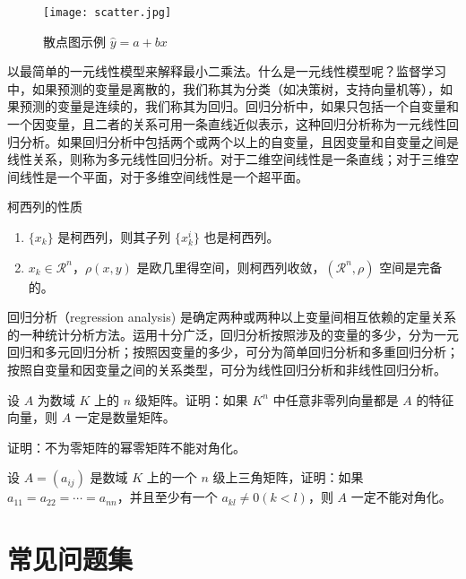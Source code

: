 \documentclass[lang=cn,10pt]{elegantbook}
\begin{document}
\begin{figure}[htbp]
  \centering
  \texttt{[image: scatter.jpg]}
  \caption{散点图示例 $\hat{y}=a+bx$ \label{fig:scatter}}
\end{figure}

以最简单的一元线性模型来解释最小二乘法。什么是一元线性模型呢？监督学习中，如果预测的变量是离散的，我们称其为分类（如决策树，支持向量机等），如果预测的变量是连续的，我们称其为回归。回归分析中，如果只包括一个自变量和一个因变量，且二者的关系可用一条直线近似表示，这种回归分析称为一元线性回归分析。如果回归分析中包括两个或两个以上的自变量，且因变量和自变量之间是线性关系，则称为多元线性回归分析。对于二维空间线性是一条直线；对于三维空间线性是一个平面，对于多维空间线性是一个超平面。

\begin{property}\label{property:cauchy}
柯西列的性质
\begin{enumerate}
\item $\{x_k\}$ 是柯西列，则其子列 $\{x_k^i\}$ 也是柯西列。
\item $x_k\in \mathcal{R}^n$，$\rho(x,y)$ 是欧几里得空间，则柯西列收敛，$(\mathcal{R}^n,\rho)$ 空间是完备的。
\end{enumerate}
\end{property}

\begin{conclusion}
回归分析（regression analysis) 是确定两种或两种以上变量间相互依赖的定量关系的一种统计分析方法。运用十分广泛，回归分析按照涉及的变量的多少，分为一元回归和多元回归分析；按照因变量的多少，可分为简单回归分析和多重回归分析；按照自变量和因变量之间的关系类型，可分为线性回归分析和非线性回归分析。
\end{conclusion}

\begin{problemset}
\item 设 $A$ 为数域 $K$ 上的 $n$ 级矩阵。证明：如果 $K^n$ 中任意非零列向量都是 $A$ 的特征向量，则 $A$ 一定是数量矩阵。
\item 证明：不为零矩阵的幂零矩阵不能对角化。
\item 设 $A = (a_{ij})$ 是数域 $K$ 上的一个 $n$ 级上三角矩阵，证明：如果 $a_{11} = a_{22} = \cdots = a_{nn}$，并且至少有一个 $a_{kl} \not = 0 (k < l)$，则 $A$ 一定不能对角化。
\end{problemset}

\chapter{常见问题集}
\end{document}
